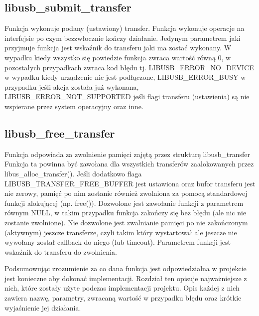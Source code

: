 \documentclass{BscUS}
\begin{document}
\subsection{libusb\_submit\_transfer}
\noindent Funkcja wykonuje podany (ustawiony) transfer.
Funkcja wykonuje operacje na interfejsie po czym bezzwłocznie kończy działanie.
Jedynym parametrem jaki przyjmuje funkcja jest wskaźnik do transferu jaki ma zostać wykonany.
\newline
W wypadku kiedy wszystko się powiedzie funkcja zwraca wartość równą 0, w pozostałych przypadkach zwraca kod błędu tj. LIBUSB\_ERROR\_NO\_DEVICE w wypadku kiedy urządzenie nie jest podłączone, LIBUSB\_ERROR\_BUSY w przypadku jeśli akcja została już wykonana, LIBUSB\_ERROR\_NOT\_SUPPORTED jeśli flagi transferu (ustawienia) są nie wspierane przez system operacyjny oraz inne.
\subsection{libusb\_free\_transfer}
\noindent Funkcja odpowiada za zwolnienie pamięci zajętą przez strukturę libusb\_transfer
Funkcja ta powinna być zawołana dla wszystkich transferów zaalokowanych przez libus\_alloc\_transfer().
Jeśli dodatkowo flaga LIBUSB\_TRANSFER\_FREE\_BUFFER jest ustawiona oraz bufor transferu jest nie zerowy, pamięć po nim zostanie również zwolniona za pomocą standardowej funkcji alokującej (np. free()).
Dozwolone jest zawołanie funkcji z parametrem równym NULL, w takim przypadku funkcja zakończy się bez błędu (ale nic nie zostanie zwolnione).
Nie dozwolone jest zwalnianie pamięci po nie zakończonym (aktywnym) jeszcze transferze, czyli takim który wystartował ale jeszcze nie wywołany został callback do niego (lub timeout).
Parametrem funkcji jest wskaźnik do transferu do zwolnienia.
\newline

\indent Podsumowując zrozumienie za co dana funkcja jest odpowiedzialna w projekcie jest konieczne aby dokonać implementacji. Rozdział ten opisuje najważniejsze z nich, które zostały użyte podczas implementacji projektu. Opis każdej z nich zawiera nazwę, parametry, zwracaną wartość w przypadku błędu oraz krótkie wyjaśnienie jej działania.
\end{document}
